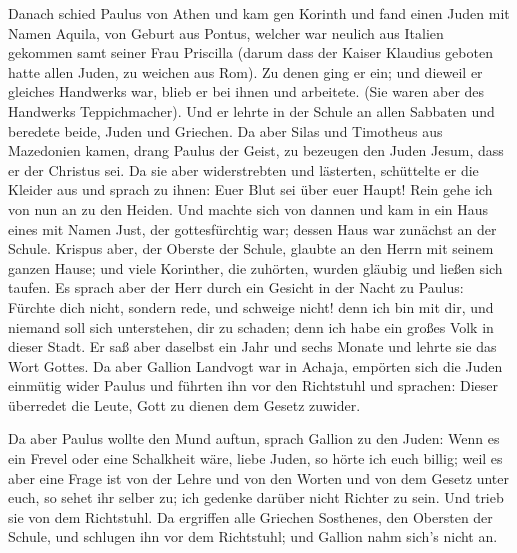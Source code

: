  Danach schied Paulus von Athen und kam gen Korinth
 und fand einen Juden mit Namen Aquila, von Geburt aus
Pontus, welcher war neulich aus Italien gekommen samt seiner Frau
Priscilla (darum dass der Kaiser Klaudius geboten hatte allen Juden, zu
weichen aus Rom).  Zu denen ging er ein; und dieweil er
gleiches Handwerks war, blieb er bei ihnen und arbeitete. (Sie waren
aber des Handwerks Teppichmacher).  Und er lehrte in der
Schule an allen Sabbaten und beredete beide, Juden und Griechen.
 Da aber Silas und Timotheus aus Mazedonien kamen, drang
Paulus der Geist, zu bezeugen den Juden Jesum, dass er der Christus sei.
 Da sie aber widerstrebten und lästerten, schüttelte er
die Kleider aus und sprach zu ihnen: Euer Blut sei über euer Haupt! Rein
gehe ich von nun an zu den Heiden.  Und machte sich von
dannen und kam in ein Haus eines mit Namen Just, der gottesfürchtig war;
dessen Haus war zunächst an der Schule.  Krispus aber, der
Oberste der Schule, glaubte an den Herrn mit seinem ganzen Hause; und
viele Korinther, die zuhörten, wurden gläubig und ließen sich taufen.
 Es sprach aber der Herr durch ein Gesicht in der Nacht zu
Paulus: Fürchte dich nicht, sondern rede, und schweige nicht!
 denn ich bin mit dir, und niemand soll sich unterstehen,
dir zu schaden; denn ich habe ein großes Volk in dieser Stadt.
 Er saß aber daselbst ein Jahr und sechs Monate und
lehrte sie das Wort Gottes.  Da aber Gallion Landvogt war
in Achaja, empörten sich die Juden einmütig wider Paulus und führten ihn
vor den Richtstuhl  und sprachen: Dieser überredet die
Leute, Gott zu dienen dem Gesetz zuwider.

 Da aber Paulus wollte den Mund auftun, sprach Gallion zu
den Juden: Wenn es ein Frevel oder eine Schalkheit wäre, liebe Juden, so
hörte ich euch billig;  weil es aber eine Frage ist von
der Lehre und von den Worten und von dem Gesetz unter euch, so sehet ihr
selber zu; ich gedenke darüber nicht Richter zu sein. 
Und trieb sie von dem Richtstuhl.  Da ergriffen alle
Griechen Sosthenes, den Obersten der Schule, und schlugen ihn vor dem
Richtstuhl; und Gallion nahm sich's nicht an.


